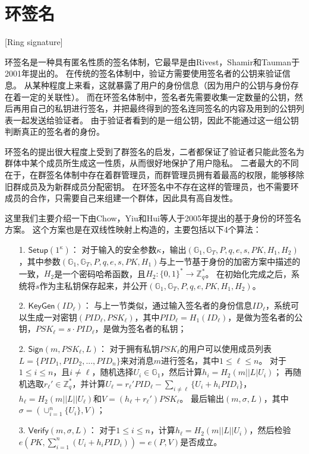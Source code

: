 \section{环签名}[Ring signature]

环签名是一种具有匿名性质的签名体制，它最早是由Rivest，Shamir和Tauman于2001年提出的\cite{rivest2001leak}。
在传统的签名体制中，验证方需要使用签名者的公钥来验证信息。
从某种程度上来看，这就暴露了用户的身份信息（因为用户的公钥与身份存在着一定的关联性）。
而在环签名体制中，签名者先需要收集一定数量的公钥，然后再用自己的私钥进行签名，并把最终得到的签名连同签名的内容及用到的公钥列表一起发送给验证者。
由于验证者看到的是一组公钥，因此不能通过这一组公钥判断真正的签名者的身份。

环签名的提出很大程度上受到了群签名的启发\cite{chaum1991group}，二者都保证了验证者只能此签名为群体中某个成员所生成这一性质，从而很好地保护了用户隐私。
二者最大的不同在于，在群签名体制中存在着群管理员，而群管理员拥有着最高的权限，能够移除旧群成员及为新群成员分配密钥。
在环签名中不存在这样的管理员，也不需要环成员的合作，只需要自己来组建一个群体，因此具有高自发性。

这里我们主要介绍一下由Chow，Yiu和Hui等人于2005年提出的基于身份的环签名方案\cite{chow2005efficient}。
这个方案也是在双线性映射上构造的，主要包括以下4个算法：

\begin{itemize}
  \item[1.] $\mathsf{Setup}(1^\kappa)$： 对于输入的安全参数$\kappa$，输出$(\mathbb{G}_1,\mathbb{G}_T,P,q,e,s,PK,H_1,H_2)$，其中参数$(\mathbb{G}_1,\mathbb{G}_T,P,q,e,s,PK,H_1)$与上一节基于身份的加密方案中描述的一致，$H_2$是一个密码哈希函数，且$H_2:\{0,1\}^*\rightarrow\mathbb{Z}_q^*$。
  在初始化完成之后，系统将$s$作为主私钥保存起来，并公开$(\mathbb{G}_1,\mathbb{G}_T,P,q,e,PK,H_1,H_2)$。
  \item[2.] $\mathsf{KeyGen}(ID_\ell)$： 与上一节类似，通过输入签名者的身份信息$ID_\ell$，系统可以生成一对密钥$(PID_\ell,PSK_\ell)$，其中$PID_\ell=H_1(ID_\ell)$，是做为签名者的公钥，$PSK_\ell=s\cdot PID_\ell$，是做为签名者的私钥；
  \item[2.] $\mathsf{Sign}(m,PSK_\ell,L)$： 对于拥有私钥$PSK_\ell$的用户可以使用成员列表$L=\{PID_1,PID_2,...,PID_n\}$来对消息$m$进行签名，其中$1\leq \ell\leq n$。
  对于$1\leq i \leq n$，且$i\neq \ell$，随机选择$U_i\in\mathbb{G}_1$，然后计算$h_i=H_2(m||L|U_i)$；
  再随机选取$r_\ell'\in\mathbb{Z}_q^*$，并计算$U_\ell=r_\ell'PID_\ell-\sum_{i\neq \ell}\{U_i+h_i PID_i\}$，$h_\ell=H_2(m||L||U_\ell)$和$V=(h_\ell+r_\ell')PSK_\ell$。
  最后输出$(m,\sigma,L)$，其中$\sigma=(\cup_{i=1}^n\{U_i\},V)$；
  \item[3.] $\mathsf{Verify}(m,\sigma,L)$： 对于$1\leq i \leq n$，计算$h_\ell=H_2(m||L||U_i)$，然后检验$e(PK,\sum_{i=1}^n(U_i+h_iPID{_i}))=e(P,V)$是否成立。
\end{itemize}

